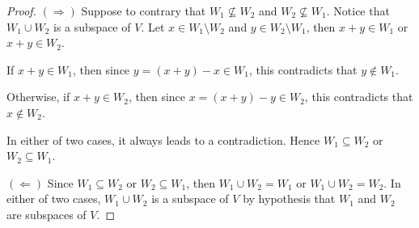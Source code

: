 \begin{Exercise}
\begin{proof}
$(\Longrightarrow)$
Suppose to contrary that $W_1\nsubseteq W_2$ and $W_2\nsubseteq W_1$. Notice that $W_1\cup W_2$ is a subspace of $V$. Let $x\in W_1\setminus W_2$ and $y\in W_2\setminus W_1$, then $x+y\in W_1$ or $x+y\in W_2$.

If $x+y\in W_1$, then since $y=(x+y)-x\in W_1$, this contradicts that $y\notin W_1$.

Otherwise, if $x+y\in W_2$, then since $x=(x+y)-y\in W_2$, this contradicts that $x\notin W_2$.

In either of two cases, it always leads to a contradiction. Hence $W_1\subseteq W_2$ or $W_2\subseteq W_1$.

$(\Longleftarrow)$
Since $W_1\subseteq W_2$ or $W_2\subseteq W_1$, then $W_1\cup W_2 = W_1$ or $W_1\cup W_2 = W_2$. In either of two cases, $W_1\cup W_2$ is a subspace of $V$ by hypothesis that $W_1$ and $W_2$ are subspaces of $V$.
\end{proof}
\end{Exercise}